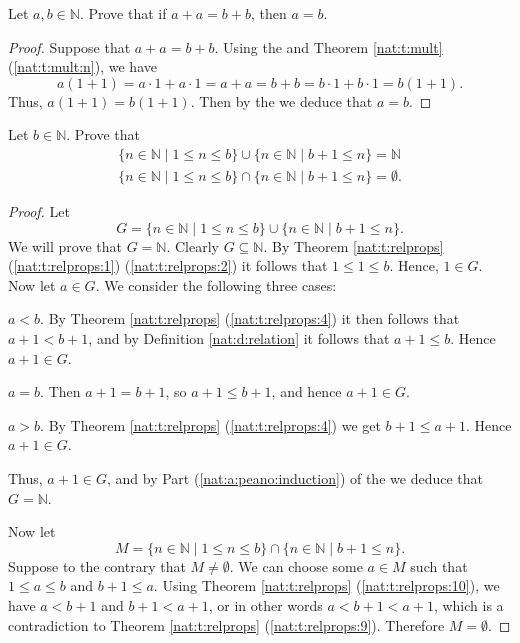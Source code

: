 \Newpage
\begin{exercise} %
	\label{nat:e:5}
	Let $a, b \in \mathbb{N}$. Prove that if $a + a = b + b$, then $a = b$.
\end{exercise}

\begin{proof}
	Suppose that $a + a = b + b$. Using the  and Theorem \ref{nat:t:mult} (\ref{nat:t:mult:n}), we have
	\[
		a(1 + 1) = a \cdot 1 + a \cdot 1 = a + a = b + b = b \cdot 1 + b \cdot 1 = b(1 + 1).
	\]
	Thus, $a(1 + 1) = b(1 + 1)$. Then by the  we deduce that $a = b$.
\end{proof}

\Newpage
\begin{exercise} %
	Let $b \in \mathbb{N}$. Prove that
	\begin{align*}
		\{n \in \mathbb{N} \mid 1 \leq n \leq b\} \cup\{n \in \mathbb{N} \mid b+1 \leq n\} = \mathbb{N} \\
		\{n \in \mathbb{N} \mid 1 \leq n \leq b\} \cap\{n \in \mathbb{N} \mid b+1 \leq n\} = \emptyset.
	\end{align*}
\end{exercise}

\begin{proof}
	Let
	\[
		G = \{n \in \mathbb{N} \mid 1 \leq n \leq b\} \cup\{n \in \mathbb{N} \mid b+1 \leq n\}.
	\]
	We will prove that $G = \mathbb{N}$. Clearly $G \subseteq \mathbb{N}$. By Theorem \ref{nat:t:relprops} (\ref{nat:t:relprops:1}) (\ref{nat:t:relprops:2}) it follows that $1 \leq 1 \leq b$. Hence, $1 \in G$. Now let $a \in G$. We consider the following three cases:
	\begin{bycases}
		\item $a < b$. By Theorem \ref{nat:t:relprops} (\ref{nat:t:relprops:4}) it then follows that $a + 1 < b + 1$, and by Definition \ref{nat:d:relation} it follows that $a + 1 \leq b$. Hence $a + 1 \in G$.
		\item $a = b$. Then $a + 1 = b + 1$, so $a + 1 \leq b + 1$, and hence $a + 1 \in G$.
		\item $a > b$. By Theorem \ref{nat:t:relprops} (\ref{nat:t:relprops:4}) we get $b + 1 \leq a + 1$. Hence $a + 1 \in G$.
	\end{bycases}
	Thus, $a + 1 \in G$, and by Part (\ref{nat:a:peano:induction}) of the  we deduce that $G = \mathbb{N}$.

	Now let
	\[
		M = \{n \in \mathbb{N} \mid 1 \leq n \leq b\} \cap\{n \in \mathbb{N} \mid b+1 \leq n\}.
	\]
	Suppose to the contrary that $M \not= \emptyset$. We can choose some $a \in M$ such that $1 \leq a \leq b$ and $b + 1 \leq a$. Using Theorem \ref{nat:t:relprops} (\ref{nat:t:relprops:10}), we have $a < b + 1$ and $b + 1 < a + 1$, or in other words $a < b + 1 < a + 1$, which is a contradiction to Theorem \ref{nat:t:relprops} (\ref{nat:t:relprops:9}). Therefore $M = \emptyset$.
\end{proof}

